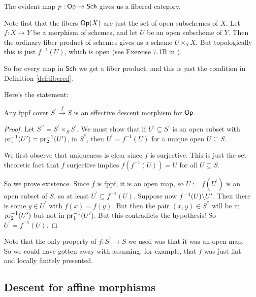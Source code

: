 \documentclass[11pt, english]{article}
\begin{document}
\begin{exc}
The evident map $p:\mathsf{Op} \to \mathsf{Sch}$ gives us a fibered category.
\end{exc}
\begin{sol}
Note first that the fibers $\mathsf{Op}(X)$ are just the set of open subschemes of $X$. Let $f:X \to Y$ be a morphism of schemes, and let $U$ be an open subscheme of $Y$. Then the ordinary fiber product of schemes gives us a scheme $U \times_Y X$. But topologically this is just $f^{-1}(U)$, which is open (see Exercise 7.1B in \cite{ravi_vakil}).

So for every map in $\mathsf{Sch}$ we get a fiber product, and this is just the condition in Definition \ref{def:fibered}.
\end{sol}

Here's the statement:
\begin{prop}
Any fppf cover $S^\prime \xrightarrow{f} S$ is an effective descent morphism for $\mathsf{Op}$. 
\end{prop}

\begin{proof}
Let $S^{\prime\prime} = S^\prime \times_S S^\prime$. We must show that if $U^\prime \subseteq S^\prime$ is an open subset with $\mathrm{pr}_1^{-1}(U^\prime) = \mathrm{pr}_2^{-1}(U^\prime)$, in $S^\dprime$, then $U^{\prime} = f^{-1}(U)$ for a unique open $U \subseteq S$. 

We first observe that uniqueness is clear since $f$ is surjective. This is just the set-theoretic fact that $f$ surjective implies $f(f^{-1}(U))=U$ for all $U \subseteq S$.

So we prove existence. Since $f$ is fppf, it is an open map, so $U := f(U^\prime)$ is an open subset of $S$, so at least $U ^\prime \subseteq f^{-1}(U)$. Suppose now $f^{-1}(U) \backslash U^\prime$. Then there is some $y \in U^\prime$ with $f(x)=f(y)$. But then the pair $(x,y) \in S^\dprime$ will be in $\mathrm{pr}_2^{-1}(U^\prime)$ but not in $\mathrm{pr}_1^{-1}(U^\prime)$. But this contradicts the hypothesis! So $U^\prime = f^{-1}(U)$.
\end{proof}
\begin{remark}
Note that the only property of $f:S^\prime \to S$ we used was that it was an open map. So we could have gotten away with assuming, for example, that $f$ was just flat and locally finitely presented.
\end{remark}



\subsection{Descent for affine morphisms}
\end{document}
